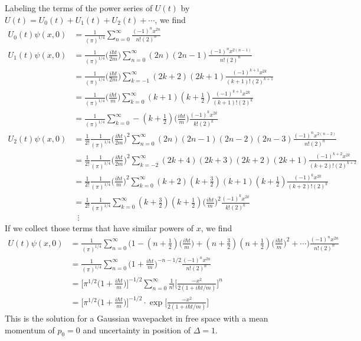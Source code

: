 \documentclass[../principles-of-quantum-mechanics.tex]{subfiles}
\begin{document}
\begin{questions}
		\begin{solution}
			Labeling the terms of the power series of $U(t)$ by $U(t) = U_0(t) + U_1(t) + U_2(t) + \cdots$, we find
			\begin{align*}
				U_0(t)\psi(x, 0) &= \frac{1}{(\pi)^{1/4}}\sum_{n=0}^{\infty}\frac{(-1)^nx^{2n}}{n!(2)^n} \\
				U_1(t)\psi(x, 0) &= \frac{1}{(\pi)^{1/4}}\Big(\frac{i\hbar t}{2m}\Big)\sum_{n=0}^{\infty}(2n)(2n - 1)\frac{(-1)^nx^{2(n - 1)}}{n!(2)^n} \\
				&= \frac{1}{(\pi)^{1/4}}\Big(\frac{i\hbar t}{2m}\Big)\sum_{k=-1}^{\infty}(2k + 2)(2k + 1)\frac{(-1)^{k+1}x^{2k}}{(k + 1)!(2)^{k + 1}} \\
				&= \frac{1}{(\pi)^{1/4}}\Big(\frac{i\hbar t}{m}\Big)\sum_{k=0}^{\infty}(k + 1)(k + \tfrac{1}{2})\frac{(-1)^{k+1}x^{2k}}{(k + 1)!(2)^k} \\
				&= \frac{1}{(\pi)^{1/4}}\sum_{k=0}^{\infty}-(k + \tfrac{1}{2})\Big(\frac{i\hbar t}{m}\Big)\frac{(-1)^{k}x^{2k}}{k!(2)^k} \\
				U_2(t)\psi(x, 0) &= \frac{1}{2!}\frac{1}{(\pi)^{1/4}}\Big(\frac{i\hbar t}{2m}\Big)^2\sum_{n=0}^{\infty}(2n)(2n - 1)(2n-2)(2n-3)\frac{(-1)^nx^{2(n - 2)}}{n!(2)^n} \\
				&= \frac{1}{2!}\frac{1}{(\pi)^{1/4}}\Big(\frac{i\hbar t}{2m}\Big)^2\sum_{k=-2}^{\infty}(2k + 4)(2k + 3)(2k + 2)(2k + 1)\frac{(-1)^{k+2}x^{2k}}{(k+2)!(2)^{k+2}} \\
				&= \frac{1}{2!}\frac{1}{(\pi)^{1/4}}\Big(\frac{i\hbar t}{m}\Big)^2\sum_{k=0}^{\infty}(k + 2)(k + \tfrac{3}{2})(k + 1)(k + \tfrac{1}{2})\frac{(-1)^{k}x^{2k}}{(k+2)!(2)^{k}} \\
				&= \frac{1}{2!}\frac{1}{(\pi)^{1/4}}\sum_{k=0}^{\infty}(k + \tfrac{3}{2})(k + \tfrac{1}{2})\Big(\frac{i\hbar t}{m}\Big)^2\frac{(-1)^{k}x^{2k}}{k!(2)^{k}} \\
				&\,\,\,\vdots
			\end{align*}
			If we collect those terms that have similar powers of $x$, we find
			\begin{align*}
				U(t)\psi(x, 0) &= \frac{1}{(\pi)^{1/4}}\sum_{n=0}^{\infty}\Big(1 - (n + \tfrac{1}{2})\Big(\frac{i\hbar t}{m}\Big) + (n+\tfrac{3}{2})(n + \tfrac{1}{2})\Big(\frac{i\hbar t}{m}\Big)^2 + \cdots\Big)\frac{(-1)^nx^{2n}}{n!(2)^n} \\
				&= \frac{1}{(\pi)^{1/4}}\sum_{n=0}^{\infty}\Big(1 + \frac{i\hbar t}{m}\Big)^{-n-1/2}\frac{(-1)^nx^{2n}}{n!(2)^n} \\
				&= \Big[\pi^{1/2}\Big(1 + \frac{i\hbar t}{m}\Big)\Big]^{-1/2}\sum_{n=0}^{\infty}\frac{1}{n!}\Big[\frac{-x^2}{2(1 + i\hbar t / m)}\Big]^n \\
				&= \Big[\pi^{1/2}\Big(1 + \frac{i\hbar t}{m}\Big)\Big]^{-1/2}\cdot\exp\Big[\frac{-x^2}{2(1 + i\hbar t / m)}\Big]
			\end{align*}
			This is the solution for a Gaussian wavepacket in free space with a mean momentum of $p_0 = 0$ and uncertainty in position of $\Delta = 1$.
		\end{solution}
		

\end{questions}
\end{document}
